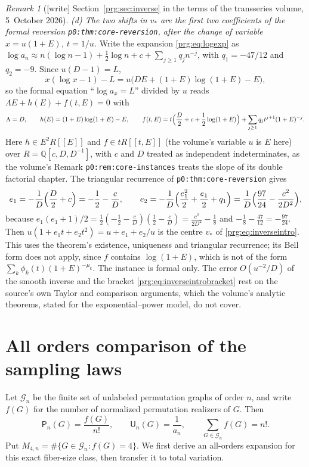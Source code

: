 \documentclass[11pt,letterpaper]{article}
\numberwithin{equation}{section}
\theoremstyle{definition}\newtheorem{definition}[theorem]{Definition}
\theoremstyle{remark}\newtheorem{remark}[theorem]{Remark}
\newcommand{\QQ}{\mathbb Q}
\newcommand{\file}[1]{\nolinkurl{#1}}
\begin{document}
\begin{remark}[{[write]} Section~\ref{prg:sec:inverse} in the terms of the transseries volume, 5~October 2026]
\emph{(d) The two shifts in $v_*$ are the first two coefficients of the formal
reversion \file{p0:thm:core-reversion}, after the change of variable
$x=u(1+E)$, $t=1/u$.} Write the expansion \eqref{prg:eq:logexp} as
$\log a_n\approx n(\log n-1)+\frac12\log n+c+\sum_{j\ge1}q_jn^{-j}$, with
$q_1=-47/12$ and $q_2=-9$. Since $u(D-1)=L$,
\[
 x(\log x-1)-L=u\bigl(DE+(1+E)\log(1+E)-E\bigr),
\]
so the formal equation ``$\log a_x=L$'' divided by $u$ reads
$\Lambda E+h(E)+f(t,E)=0$ with
\[
 \Lambda=D,\qquad h(E)=(1+E)\log(1+E)-E,\qquad
 f(t,E)=t\Bigl(\frac D2+c+\frac12\log(1+E)\Bigr)
       +\sum_{j\ge1}q_jt^{j+1}(1+E)^{-j}.
\]
Here $h\in E^2R[[E]]$ and $f\in tR[[t,E]]$ (the volume's variable $u$ is $E$
here) over $R=\QQ[c,D,D^{-1}]$, with $c$ and $D$ treated as independent
indeterminates, as the volume's Remark \file{p0:rem:core-instances} treats the
slope of its double factorial chapter. The triangular recurrence of
\file{p0:thm:core-reversion} gives
\[
 e_1=-\frac1D\Bigl(\frac D2+c\Bigr)=-\frac12-\frac cD,\qquad
 e_2=-\frac1D\Bigl(\frac{e_1^2}2+\frac{e_1}2+q_1\Bigr)
    =\frac1D\Bigl(\frac{97}{24}-\frac{c^2}{2D^2}\Bigr),
\]
because $e_1(e_1+1)/2=\frac12(-\frac12-\frac cD)(\frac12-\frac cD)
=\frac{c^2}{2D^2}-\frac18$ and $-\frac18-\frac{47}{12}=-\frac{97}{24}$. Then
$u(1+e_1t+e_2t^2)=u+e_1+e_2/u$ is the centre $v_*$ of
\eqref{prg:eq:inverseintro}. This uses the theorem's existence, uniqueness and
triangular recurrence; its Bell form does not apply, since $f$ contains
$\log(1+E)$, which is not of the form $\sum_k\phi_k(t)(1+E)^{-\mu_k}$. The
instance is formal only. The error $O(u^{-2}/D)$ of the smooth inverse and the
bracket \eqref{prg:eq:inverseintrobracket} rest on the source's own Taylor and
comparison arguments, which the volume's analytic theorems, stated for the
exponential--power model, do not cover.
\end{remark}

\section{All orders comparison of the sampling laws}\label{prg:sec:tv}

Let $\mathcal G_n$ be the finite set of unlabeled permutation graphs
of order $n$, and write $f(G)$ for the number of normalized
permutation realizers of $G$. Then
\begin{equation}\label{prg:eq:laws}
 \mathsf P_n(G)=\frac{f(G)}{n!},\qquad
 \mathsf U_n(G)=\frac1{a_n},\qquad
 \sum_{G\in\mathcal G_n}f(G)=n!.
\end{equation}
Put $M_{4,n}=\#\{G\in\mathcal G_n:f(G)=4\}$. We first derive an
all-orders expansion for this exact fiber-size class, then transfer
it to total variation.
\end{document}
